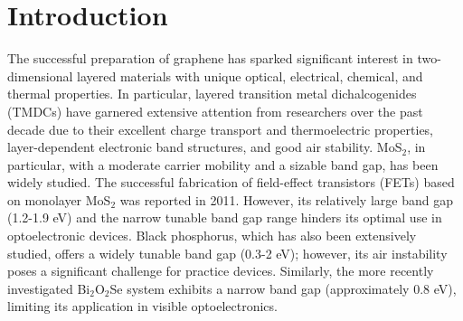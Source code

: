 \documentclass[twoside,twocolumn,9pt]{article}
\begin{document}






\section{Introduction}
The successful preparation of graphene has sparked significant interest in two-dimensional layered materials with unique optical, electrical, chemical, and thermal properties. In particular, layered transition metal dichalcogenides (TMDCs) have garnered extensive attention from researchers over the past decade due to their excellent charge transport and thermoelectric properties, layer-dependent electronic band structures, and good air stability.\cite{jariwala2017van,novoselov20162d,pan2014construction} MoS$_2$, in particular, with a moderate carrier mobility and a sizable band gap, has been widely studied.\cite{radisavljevic2011single,liu2019high} The successful fabrication of field-effect transistors (FETs) based on monolayer MoS$_2$ was reported in 2011.\cite{coleman2011two,mak2010atomically} However, its relatively large band gap (1.2-1.9 eV) \cite{manzeli20172d} and the narrow tunable band gap range hinders its optimal use in optoelectronic devices. Black phosphorus, which has also been extensively studied, offers a widely tunable band gap (0.3-2 eV); however, its air instability poses a significant challenge for practice devices.\cite{ong2014anisotropic,tran2014layer} Similarly, the more recently investigated Bi$_2$O$_2$Se system exhibits a narrow band gap (approximately 0.8 eV), limiting its application in visible optoelectronics.\cite{wu2017controlled,wu2017high}
\end{document}
